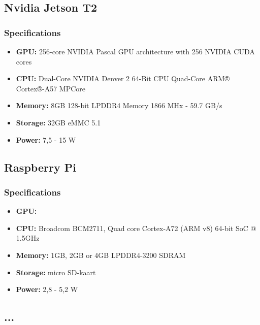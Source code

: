	\subsection{Nvidia Jetson T2}
		\subsubsection{Specifications}
		\begin{itemize}
			\item \textbf{GPU:} 256-core NVIDIA Pascal GPU architecture with 256 NVIDIA CUDA cores
			\item \textbf{CPU:} Dual-Core NVIDIA Denver 2 64-Bit CPU Quad-Core ARM® Cortex®-A57 MPCore
			\item \textbf{Memory:} 8GB 128-bit LPDDR4 Memory 1866 MHx - 59.7 GB/s
			\item \textbf{Storage:}  32GB eMMC 5.1
			\item \textbf{Power:} 7,5 - 15 W
		\end{itemize}	
	\subsection{Raspberry Pi}
		\subsubsection{Specifications}
		\begin{itemize}
			\item \textbf{GPU:} 
			\item \textbf{CPU:} Broadcom BCM2711, Quad core Cortex-A72 (ARM v8) 64-bit SoC @ 1.5GHz
			\item \textbf{Memory:} 1GB, 2GB or 4GB LPDDR4-3200 SDRAM 
			\item \textbf{Storage:}  micro SD-kaart
			\item \textbf{Power:} 2,8 - 5,2 W
		\end{itemize}	
	
	\subsection{...}
	

	


